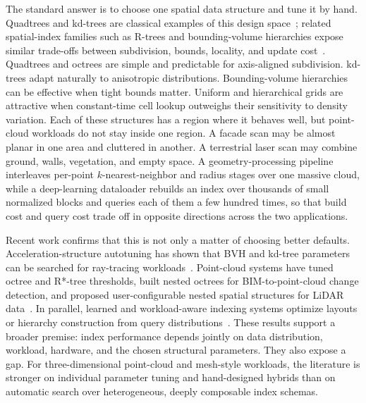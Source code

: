 The standard answer is to choose one spatial data structure and tune it by hand. Quadtrees and kd-trees are classical examples of this design space~\cite{finkel1974quadtrees,bentley1975kdtree}; related spatial-index families such as R-trees and bounding-volume hierarchies expose similar trade-offs between subdivision, bounds, locality, and update cost~\cite{guttman1984rtree,karras2012lbvh}. Quadtrees and octrees are simple and predictable for axis-aligned subdivision. kd-trees adapt naturally to anisotropic distributions. Bounding-volume hierarchies can be effective when tight bounds matter. Uniform and hierarchical grids are attractive when constant-time cell lookup outweighs their sensitivity to density variation. Each of these structures has a region where it behaves well, but point-cloud workloads do not stay inside one region. A facade scan may be almost planar in one area and cluttered in another. A terrestrial laser scan may combine ground, walls, vegetation, and empty space. A geometry-processing pipeline interleaves per-point $k$-nearest-neighbor and radius stages over one massive cloud, while a deep-learning dataloader rebuilds an index over thousands of small normalized blocks and queries each of them a few hundred times, so that build cost and query cost trade off in opposite directions across the two applications.

Recent work confirms that this is not only a matter of choosing better defaults. Acceleration-structure autotuning has shown that BVH and kd-tree parameters can be searched for ray-tracing workloads~\cite{herveau2023autotuning}. Point-cloud systems have tuned octree and R*-tree thresholds, built nested octrees for BIM-to-point-cloud change detection, and proposed user-configurable nested spatial structures for LiDAR data~\cite{wang2021hybridpointcloud,park2021nestedoctree,ogayar2023nestedlidar}. In parallel, learned and workload-aware indexing systems optimize layouts or hierarchy construction from query distributions~\cite{sheng2023wisk,pai2023wazi,wang2025litune}. These results support a broader premise: index performance depends jointly on data distribution, workload, hardware, and the chosen structural parameters. They also expose a gap. For three-dimensional point-cloud and mesh-style workloads, the literature is stronger on individual parameter tuning and hand-designed hybrids than on automatic search over heterogeneous, deeply composable index schemas.

